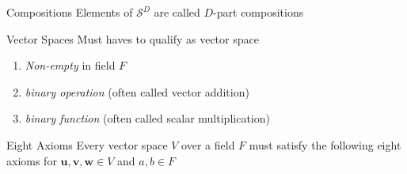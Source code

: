 \documentclass[dark]{cgem-presentation}
\begin{document}
\begin{frame}{Compositions}
	\LARGE
	Elements of $\mathcal{S}^D$ are called $D$-part compositions
\end{frame}

\begin{frame}{Vector Spaces}
	\LARGE
	Must haves to qualify as vector space
	\begin{enumerate}
		\item \textit{Non-empty} in field $F$
		\item \textit{binary operation} (often called vector addition)
		\item \textit{binary function} (often called scalar multiplication)
	\end{enumerate}
\end{frame}

\begin{frame}{Eight Axioms}
	\LARGE
	Every vector space $V$ over a field $F$ must satisfy
	the following eight axioms for $\mathbf{u}, \mathbf{v}, 
	\mathbf{w} \in V$ and $a, b \in F$
\end{frame}
\end{document}
